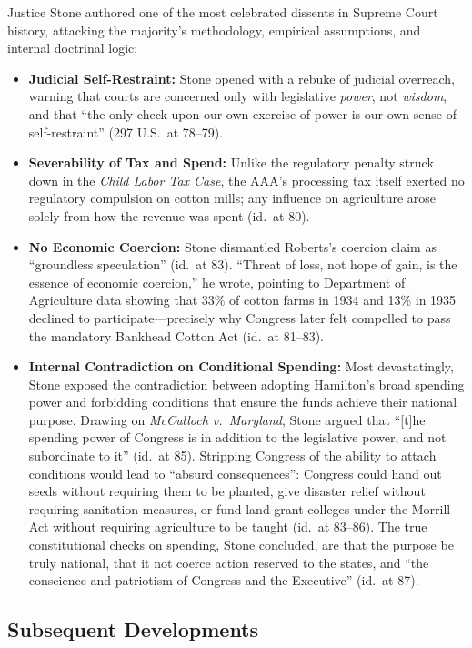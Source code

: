 \documentclass[12pt]{article}
\begin{document}
Justice Stone authored one of the most celebrated dissents in Supreme Court history, attacking the majority's methodology, empirical assumptions, and internal doctrinal logic:
\begin{itemize}
  \item \textbf{Judicial Self-Restraint:} Stone opened with a rebuke of judicial overreach, warning that courts are concerned only with legislative \textit{power}, not \textit{wisdom}, and that ``the only check upon our own exercise of power is our own sense of self-restraint'' (297 U.S.\ at 78--79).
  \item \textbf{Severability of Tax and Spend:} Unlike the regulatory penalty struck down in the \textit{Child Labor Tax Case}, the AAA's processing tax itself exerted no regulatory compulsion on cotton mills; any influence on agriculture arose solely from how the revenue was spent (id.\ at 80).
  \item \textbf{No Economic Coercion:} Stone dismantled Roberts's coercion claim as ``groundless speculation'' (id.\ at 83). ``Threat of loss, not hope of gain, is the essence of economic coercion,'' he wrote, pointing to Department of Agriculture data showing that 33\% of cotton farms in 1934 and 13\% in 1935 declined to participate---precisely why Congress later felt compelled to pass the mandatory Bankhead Cotton Act (id.\ at 81--83).
  \item \textbf{Internal Contradiction on Conditional Spending:} Most devastatingly, Stone exposed the contradiction between adopting Hamilton's broad spending power and forbidding conditions that ensure the funds achieve their national purpose. Drawing on \textit{McCulloch v.\ Maryland}, Stone argued that ``[t]he spending power of Congress is in addition to the legislative power, and not subordinate to it'' (id.\ at 85). Stripping Congress of the ability to attach conditions would lead to ``absurd consequences'': Congress could hand out seeds without requiring them to be planted, give disaster relief without requiring sanitation measures, or fund land-grant colleges under the Morrill Act without requiring agriculture to be taught (id.\ at 83--86). The true constitutional checks on spending, Stone concluded, are that the purpose be truly national, that it not coerce action reserved to the states, and ``the conscience and patriotism of Congress and the Executive'' (id.\ at 87).
\end{itemize}

\subsection{Subsequent Developments}
\end{document}
